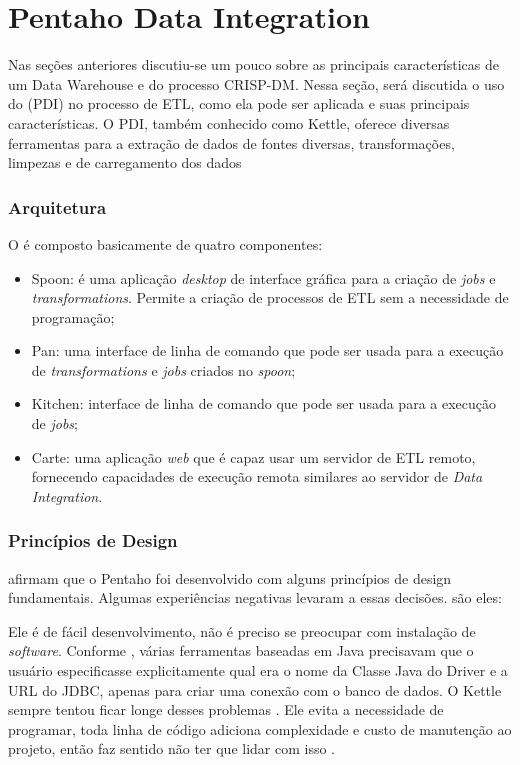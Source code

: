 \section{Pentaho Data Integration}
Nas seções anteriores discutiu-se um pouco sobre as principais características de um Data Warehouse e do processo CRISP-DM. Nessa seção, será discutida o uso do \pdi (PDI) no processo de ETL, como ela pode ser aplicada e suas principais características.
O PDI, também conhecido como Kettle, oferece diversas ferramentas para a extração de dados de fontes diversas, transformações, limpezas e de carregamento dos dados
\subsubsection{Arquitetura}
O \pdi é composto basicamente de quatro componentes:
\begin{itemize}
    \item Spoon: é uma aplicação \textit{desktop} de interface gráfica para a criação de \textit{jobs} e \textit{transformations}. Permite a criação de processos de ETL sem a necessidade de programação;
    \item Pan: uma interface de linha de comando que pode ser usada para a execução de \textit{transformations} e \textit{jobs} criados no \textit{spoon};
    \item Kitchen: interface de linha de comando que pode ser usada para a execução de \textit{jobs};
    \item Carte: uma aplicação \textit{web} que é capaz usar um servidor de ETL remoto, fornecendo capacidades de execução remota similares ao servidor de \textit{Data Integration}.
\end{itemize}

\subsubsection{Princípios de Design}
 afirmam que o Pentaho foi desenvolvido com alguns princípios de design fundamentais. Algumas experiências negativas levaram a essas decisões. são eles:

Ele é de fácil desenvolvimento, não é preciso se preocupar com instalação de \textit{software}. Conforme , várias ferramentas baseadas em Java precisavam que o usuário especificasse explicitamente qual era o nome da Classe Java do Driver e a URL do JDBC, apenas para criar uma conexão com o banco de dados. O Kettle sempre tentou ficar longe desses problemas \citep{kettle}. Ele evita a necessidade de programar, toda linha de código adiciona complexidade e custo de manutenção ao projeto, então faz sentido não ter que lidar com isso \citep{kettle}.

